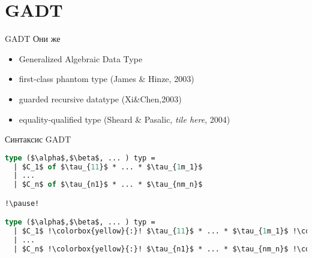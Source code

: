\documentclass[10pt, mathserif]{beamer}
\theoremstyle{definition}
\begin{document}

% 
% 
% 
% 
% 
% 
% 


\section{GADT}

\begin{frame}[fragile]{GADT}
Они же
\begin{itemize}
\item Generalized Algebraic Data Type
\item first-class phantom type (James \& Hinze, 2003)
\item guarded recursive datatype (Xi\&Chen,2003)
\item equality-qualified type (Sheard \& Pasalic, \textit{tile here}, 2004)
\end{itemize}

\end{frame}

\begin{frame}[fragile]{Синтаксис GADT}
\begin{lstlisting}[language=ocaml,mathescape=true]
type ($\alpha$,$\beta$, ... ) typ =
  | $C_1$ of $\tau_{11}$ * ... * $\tau_{1m_1}$
  | ...
  | $C_n$ of $\tau_{n1}$ * ... * $\tau_{nm_n}$

!\pause!

type ($\alpha$,$\beta$, ... ) typ =
  | $C_1$ !\colorbox{yellow}{:}! $\tau_{11}$ * ... * $\tau_{1m_1}$ !\colorbox{yellow}{$\rightarrow$ ($t_{11}$, $t_{12}$, ...) typ}!
  | ...
  | $C_n$ !\colorbox{yellow}{:}! $\tau_{n1}$ * ... * $\tau_{nm_n}$ !\colorbox{yellow}{$\rightarrow$ ($t_{n1}$, $t_{n2}$, ...) typ}!
\end{lstlisting}

\end{frame}
\end{document}
